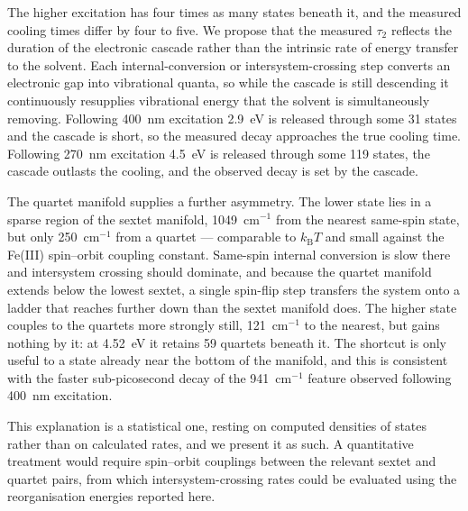 \documentclass[11pt,a4paper]{article}
\newcommand{\wn}{\ensuremath{\mathrm{cm^{-1}}}}
\begin{document}
The higher excitation has four times as many states beneath it, and the
measured cooling times differ by four to five. We propose that the measured
$\tau_2$ reflects the duration of the electronic cascade rather than the
intrinsic rate of energy transfer to the solvent. Each internal-conversion or
intersystem-crossing step converts an electronic gap into vibrational quanta,
so while the cascade is still descending it continuously resupplies vibrational
energy that the solvent is simultaneously removing. Following 400~nm excitation
2.9~eV is released through some 31 states and the cascade is short, so the
measured decay approaches the true cooling time. Following 270~nm excitation
4.5~eV is released through some 119 states, the cascade outlasts the cooling,
and the observed decay is set by the cascade.

The quartet manifold supplies a further asymmetry. The lower state lies in a
sparse region of the sextet manifold, 1049~\wn{} from the nearest same-spin
state, but only 250~\wn{} from a quartet --- comparable to $k_{\mathrm{B}}T$ and
small against the Fe(III) spin--orbit coupling constant. Same-spin internal
conversion is slow there and intersystem crossing should dominate, and because
the quartet manifold extends below the lowest sextet, a single spin-flip step
transfers the system onto a ladder that reaches further down than the sextet
manifold does. The higher state couples to the quartets more strongly still,
121~\wn{} to the nearest, but gains nothing by it: at 4.52~eV it retains 59
quartets beneath it. The shortcut is only useful to a state already near the
bottom of the manifold, and this is consistent with the faster sub-picosecond
decay of the 941~\wn{} feature observed following 400~nm excitation.

This explanation is a statistical one, resting on computed densities of states
rather than on calculated rates, and we present it as such. A quantitative
treatment would require spin--orbit couplings between the relevant sextet and
quartet pairs, from which intersystem-crossing rates could be evaluated using
the reorganisation energies reported here.
\end{document}
